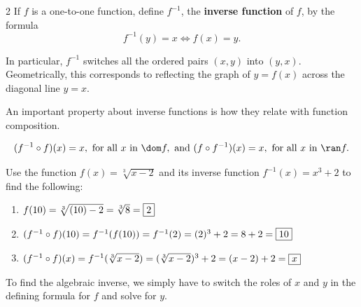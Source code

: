 \documentclass{book}
\begin{document}
\begin{Def}
\begin{multicols}{2}
 If $f$ is a one-to-one function, define $f^{-1}$, the \textbf{inverse function} of $f$, by the formula
\[f^{-1}(y) = x \Longleftrightarrow f(x) = y.\]


In particular, $f^{-1}$ switches all the ordered pairs $(x,y)$ into $(y,x)$. Geometrically, this corresponds to reflecting the graph of $y=f(x)$ across the diagonal line $y=x$. \vfill\columnbreak

\begin{center}
\end{center}
\end{multicols}
\end{Def}\vs

An important property about inverse functions is how they relate with function composition. 

\begin{equation} (f^{-1}\circ f)(x) = x, \text{ for all } x \text{ in } \dom f, \text{ and } (f\circ f^{-1})(x) = x, \text{ for all } x \text{ in } \ran f.\end{equation}

\begin{Exam} Use the function $f(x) = \sqrt[3]{x-2}$ and its inverse function $f^{-1}(x) = x^3+2$ to find the following:
\begin{enumerate}
\item $f(10) = \sqrt[3]{(10)-2} = \sqrt[3]{8} = \fbox{2}$\\
\item $(f^{-1}\circ f)(10) = f^{-1}(f(10)) = f^{-1}(2) = (2)^3+2 = 8+2 = \fbox{10}$\\
\item $(f^{-1}\circ f)(x) = f^{-1}(\sqrt[3]{x-2}) = (\sqrt[3]{x-2})^3+2 = (x-2) +2 = \fbox{$x$}$
\end{enumerate}
\end{Exam}\vs

To find the algebraic inverse, we simply have to switch the roles of $x$ and $y$ in the defining formula for $f$ and solve for $y$.
\end{document}
